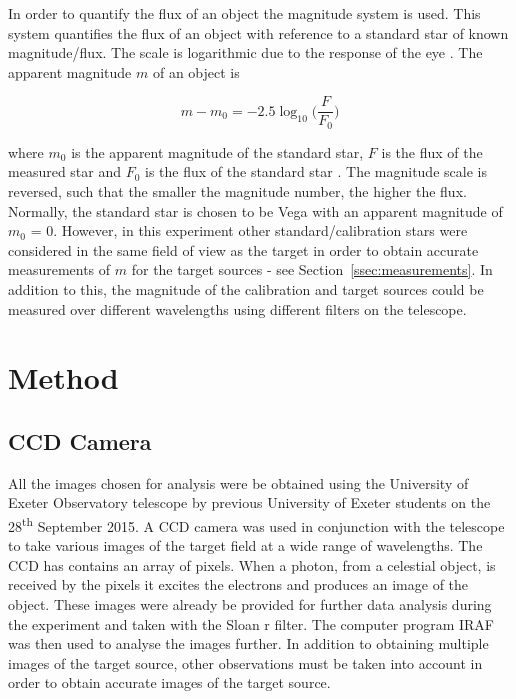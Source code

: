 \documentclass{article}
\newcommand{\secref}[2][Section~]{#1\ref{#2}}
\begin{document}
\vspace{2mm}
\noindent
In order to quantify the flux of an object the magnitude system is used. This system quantifies the flux of an object with reference to a standard star of known magnitude/flux. The scale is logarithmic due to the response of the eye \cite{Paper01}. The apparent magnitude $m$ of an object is

\begin{equation}
\label{eq:apparent-magnitude}
m - m_0 = -2.5\log_{10}\bigg(\frac{F}{F_0}\bigg)
\end{equation}

\vspace{2mm}
\noindent
where $m_0$ is the apparent magnitude of the standard star, $F$ is the flux of the measured star and $F_0$ is the flux of the standard star \cite{Paper01}. The magnitude scale is reversed, such that the smaller the magnitude number, the higher the flux. Normally, the standard star is chosen to be Vega with an apparent magnitude of $m_0$ = 0. However, in this experiment other standard/calibration stars were considered in the same field of view as the target \cite{Paper01} in order to obtain accurate measurements of $m$ for the target sources - see \secref{ssec:measurements}. In addition to this, the magnitude of the calibration and target sources could be measured over different wavelengths using different filters \cite{Paper01} on the telescope.

\vspace{2mm}
\noindent
 
\section{Method}
\label{sec:method}

\subsection{CCD Camera}
\label{ssec:camera}

All the images chosen for analysis were be obtained using the University of Exeter Observatory telescope by previous University of Exeter students on the 28\textsuperscript{th} September 2015. A CCD camera was used in conjunction with the telescope to take various images of the target field at a wide range of wavelengths. The CCD has contains an array of pixels. When a photon, from a celestial object, is received by the pixels it excites the electrons and produces an image of the object. These images were already be provided for further data analysis during the experiment and taken with the Sloan r filter. The computer program IRAF was then used to analyse the images further. In addition to obtaining multiple images of the target source, other observations must be taken into account in order to obtain accurate images of the target source.
\end{document}
